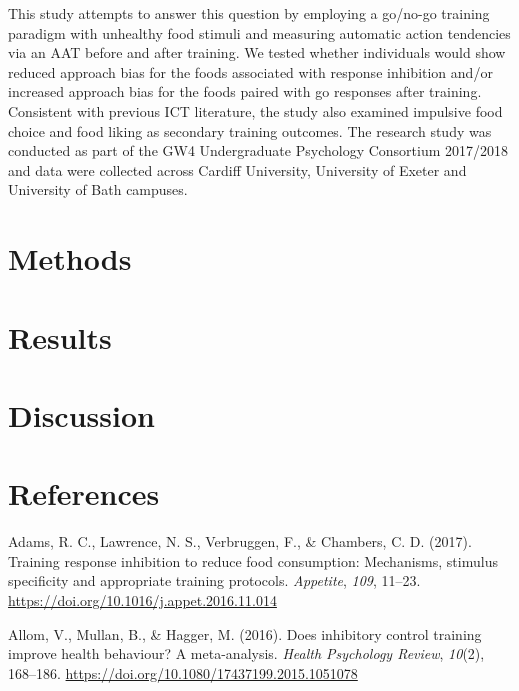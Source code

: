 \documentclass[man]{apa6}
\begin{document}
\par

This study attempts to answer this question by employing a go/no-go training paradigm with unhealthy food stimuli and measuring automatic action tendencies via an AAT before and after training. We tested whether individuals would show reduced approach bias for the foods associated with response inhibition and/or increased approach bias for the foods paired with go responses after training. Consistent with previous ICT literature, the study also examined impulsive food choice and food liking as secondary training outcomes. The research study was conducted as part of the GW4 Undergraduate Psychology Consortium 2017/2018 and data were collected across Cardiff University, University of Exeter and University of Bath campuses.

\hypertarget{methods}{%
\section{Methods}\label{methods}}

\hypertarget{results}{%
\section{Results}\label{results}}

\hypertarget{discussion}{%
\section{Discussion}\label{discussion}}

\newpage

\hypertarget{references}{%
\section{References}\label{references}}

\begingroup
\setlength{\parindent}{-0.5in}
\setlength{\leftskip}{0.5in}

\hypertarget{refs}{}
\leavevmode\hypertarget{ref-adams_training_2017}{}%
Adams, R. C., Lawrence, N. S., Verbruggen, F., \& Chambers, C. D. (2017). Training response inhibition to reduce food consumption: Mechanisms, stimulus specificity and appropriate training protocols. \emph{Appetite}, \emph{109}, 11--23. \url{https://doi.org/10.1016/j.appet.2016.11.014}

\leavevmode\hypertarget{ref-allomDoesInhibitoryControl2016}{}%
Allom, V., Mullan, B., \& Hagger, M. (2016). Does inhibitory control training improve health behaviour? A meta-analysis. \emph{Health Psychology Review}, \emph{10}(2), 168--186. \url{https://doi.org/10.1080/17437199.2015.1051078}
\end{document}
